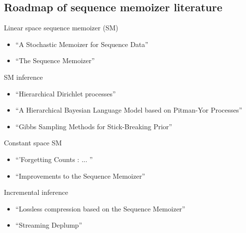 \documentclass[16pt]{beamer}
\begin{document}
\subsection{Roadmap of sequence memoizer literature}
\begin{frame}[t]{}
Linear space sequence memoizer (SM)
\begin{itemize}
\item ``A Stochastic Memoizer for Sequence Data'' \cite{Wood2009}
\item ``The Sequence Memoizer'' \cite{Wood2011}
\end{itemize}
SM inference
\begin{itemize}
\item ``Hierarchical Dirichlet processes'' \cite{Teh2006b}
\item ``A Hierarchical {B}ayesian Language Model based on {P}itman-{Y}or Processes'' \cite{Teh2006a}
\item ``Gibbs Sampling Methods for Stick-Breaking Prior'' \cite{Ishwaran2001a}
\end{itemize}
Constant space SM
\begin{itemize}
\item ``'Forgetting Counts : ... '' \cite{Bartlett2010}
\item ``Improvements to the Sequence Memoizer'' \cite{Gasthaus2011}
\end{itemize}
Incremental inference
\begin{itemize}
\item ``Lossless compression based on the {S}equence {M}emoizer'' \cite{Gasthaus2010}
\item ``Streaming Deplump'' \cite{Bartlett2011}
\end{itemize}

\end{frame}
\end{document}
